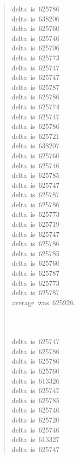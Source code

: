 \documentclass[letterpaper]{article}
\begin{document}
\begin{quote}
{delta~is~625786\\
delta~is~638206\\
delta~is~625760\\
delta~is~625746\\
delta~is~625706\\
delta~is~625773\\
delta~is~625747\\
delta~is~625747\\
delta~is~625787\\
delta~is~625786\\
delta~is~625774\\
delta~is~625747\\
delta~is~625786\\
delta~is~625721\\
delta~is~638207\\
delta~is~625760\\
delta~is~625746\\
delta~is~625785\\
delta~is~625747\\
delta~is~625787\\
delta~is~625786\\
delta~is~625773\\
delta~is~625719\\
delta~is~625747\\
delta~is~625786\\
delta~is~625785\\
delta~is~625760\\
delta~is~625787\\
delta~is~625773\\
delta~is~625787\\
average~was~625926.\\
~\\
~\\
~\\
delta~is~625747\\
delta~is~625786\\
delta~is~625786\\
delta~is~625760\\
delta~is~613326\\
delta~is~625747\\
delta~is~625785\\
delta~is~625746\\
delta~is~625720\\
delta~is~625746\\
delta~is~613327\\
delta~is~625747\\
}
\end{quote}
\end{document}
